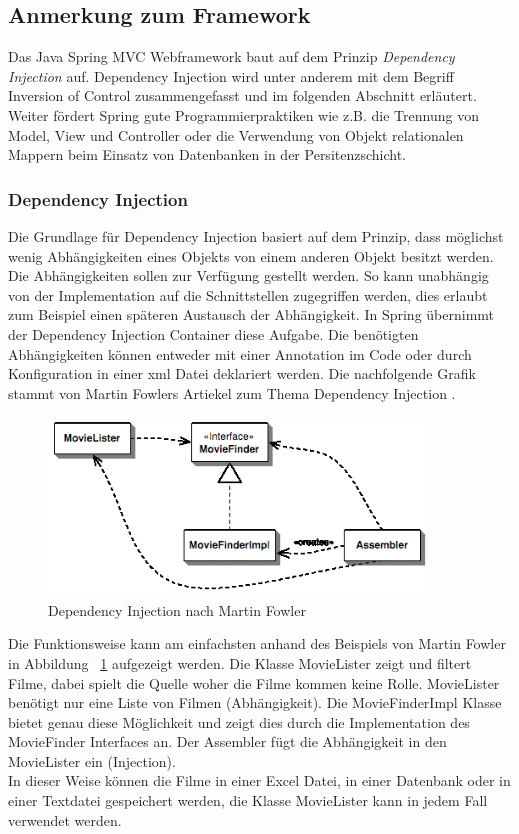 \subsection{Anmerkung zum Framework}
Das Java Spring MVC Webframework baut auf dem Prinzip \textit{Dependency Injection} auf. Dependency Injection wird unter anderem mit dem Begriff Inversion of Control zusammengefasst und im folgenden Abschnitt erläutert. Weiter fördert Spring gute Programmierpraktiken wie z.B. die Trennung von Model, View und Controller oder die Verwendung von Objekt relationalen Mappern beim Einsatz von Datenbanken in der Persitenzschicht.

\subsubsection{Dependency Injection}
Die Grundlage für Dependency Injection basiert auf dem Prinzip, dass möglichst wenig Abhängigkeiten eines Objekts von einem anderen Objekt besitzt werden. Die Abhängigkeiten sollen zur Verfügung gestellt werden. So kann unabhängig von der Implementation auf die Schnittstellen zugegriffen werden, dies erlaubt zum Beispiel einen späteren Austausch der Abhängigkeit. In Spring übernimmt der Dependency Injection Container diese Aufgabe. Die benötigten Abhängigkeiten können entweder mit einer Annotation im Code oder durch Konfiguration in einer xml Datei deklariert werden. Die nachfolgende Grafik stammt von Martin Fowlers Artiekel zum Thema Dependency Injection \cite{martinfowler2004}.
\begin{figure}[H]
	\centering
	\includegraphics[width=100mm]{images/tourliveweb/dependencyinjection.png}
	\caption{Dependency Injection nach Martin Fowler \cite{martinfowler2004}}
	\label{fig:dpendencyinjection}
\end{figure}
Die Funktionsweise kann am einfachsten anhand des Beispiels von Martin Fowler in Abbildung ~\ref{fig:dpendencyinjection} aufgezeigt werden. Die Klasse MovieLister zeigt und filtert Filme, dabei spielt die Quelle woher die Filme kommen keine Rolle. MovieLister benötigt nur eine Liste von Filmen (Abhängigkeit). Die MovieFinderImpl Klasse bietet genau diese Möglichkeit und zeigt dies durch die Implementation des MovieFinder Interfaces an. Der Assembler fügt die Abhängigkeit in den MovieLister ein (Injection).
\\
In dieser Weise können die Filme in einer Excel Datei, in einer Datenbank oder in einer Textdatei gespeichert werden, die Klasse MovieLister kann in jedem Fall verwendet werden.

